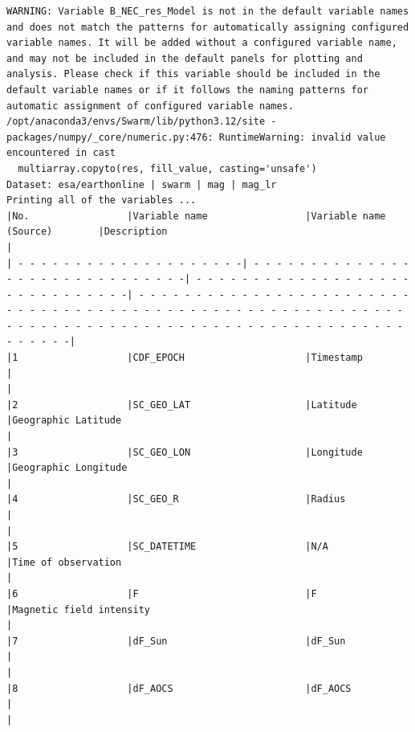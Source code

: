 \begin{verbatim}
WARNING: Variable B_NEC_res_Model is not in the default variable names and does not match the patterns for automatically assigning configured variable names. It will be added without a configured variable name, and may not be included in the default panels for plotting and analysis. Please check if this variable should be included in the default variable names or if it follows the naming patterns for automatic assignment of configured variable names.
/opt/anaconda3/envs/Swarm/lib/python3.12/site -packages/numpy/_core/numeric.py:476: RuntimeWarning: invalid value encountered in cast
  multiarray.copyto(res, fill_value, casting='unsafe')
Dataset: esa/earthonline | swarm | mag | mag_lr
Printing all of the variables ...
|No.                 |Variable name                 |Variable name (Source)        |Description                                                                                         |
| - - - - - - - - - - - - - - - - - - - -| - - - - - - - - - - - - - - - - - - - - - - - - - - - - - -| - - - - - - - - - - - - - - - - - - - - - - - - - - - - - -| - - - - - - - - - - - - - - - - - - - - - - - - - - - - - - - - - - - - - - - - - - - - - - - - - - - - - - - - - - - - - - - - - - - - - - - - - - - - - - - - - - - - - - - - - - - - - - - - - - - -|
|1                   |CDF_EPOCH                     |Timestamp                     |                                                                                                    |
|2                   |SC_GEO_LAT                    |Latitude                      |Geographic Latitude                                                                                 |
|3                   |SC_GEO_LON                    |Longitude                     |Geographic Longitude                                                                                |
|4                   |SC_GEO_R                      |Radius                        |                                                                                                    |
|5                   |SC_DATETIME                   |N/A                           |Time of observation                                                                                 |
|6                   |F                             |F                             |Magnetic field intensity                                                                            |
|7                   |dF_Sun                        |dF_Sun                        |                                                                                                    |
|8                   |dF_AOCS                       |dF_AOCS                       |                                                                                                    |

\end{verbatim}
